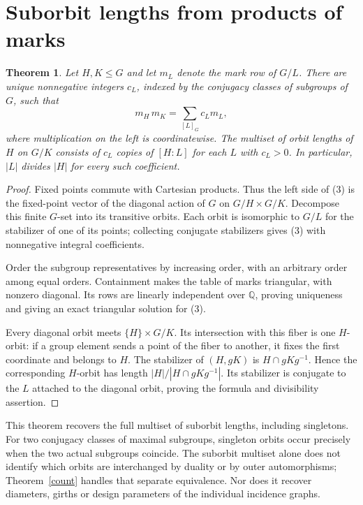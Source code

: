 \documentclass[11pt]{article}
\newtheorem{theorem}{Theorem}
\begin{document}
\section{Suborbit lengths from products of marks}
\begin{theorem}\label{product}
Let $H,K\leq G$ and let $m_L$ denote the mark row of $G/L$.
There are unique nonnegative integers $c_L$, indexed by the conjugacy
classes of subgroups of $G$, such that
\[
              m_H\,m_K=\sum_{[L]_G}c_Lm_L,                 \tag{3}
\]
where multiplication on the left is coordinatewise. The multiset of
orbit lengths of $H$ on $G/K$ consists of $c_L$ copies of $[H:L]$
for each $L$ with $c_L>0$. In particular, $|L|$ divides $|H|$ for
every such coefficient.
\end{theorem}
\begin{proof}
Fixed points commute with Cartesian products. Thus the left side of
(3) is the fixed-point vector of the diagonal action of $G$ on
$G/H\times G/K$. Decompose this finite $G$-set into its transitive
orbits. Each orbit is isomorphic to $G/L$ for the stabilizer of one
of its points; collecting conjugate stabilizers gives (3) with
nonnegative integral coefficients.

Order the subgroup representatives by increasing order, with an
arbitrary order among equal orders. Containment makes the table of
marks triangular, with nonzero diagonal. Its rows are linearly
independent over $\mathbb Q$, proving uniqueness and giving an exact
triangular solution for (3).

Every diagonal orbit meets $\{H\}\times G/K$. Its intersection
with this fiber is one $H$-orbit: if a group element sends a point of
the fiber to another, it fixes the first coordinate and belongs to
$H$. The stabilizer of $(H,gK)$ is $H\cap gKg^{-1}$. Hence the
corresponding $H$-orbit has length $|H|/|H\cap gKg^{-1}|$.
Its stabilizer is conjugate to the $L$ attached to the diagonal
orbit, proving the formula and divisibility assertion.
\end{proof}
This theorem recovers the full multiset of suborbit lengths, including
singletons. For two conjugacy classes of maximal subgroups, singleton
orbits occur precisely when the two actual subgroups coincide. The
suborbit multiset alone does not identify which orbits are interchanged
by duality or by outer automorphisms; Theorem~\ref{count} handles that
separate equivalence. Nor does it recover diameters, girths or design
parameters of the individual incidence graphs.
\end{document}
